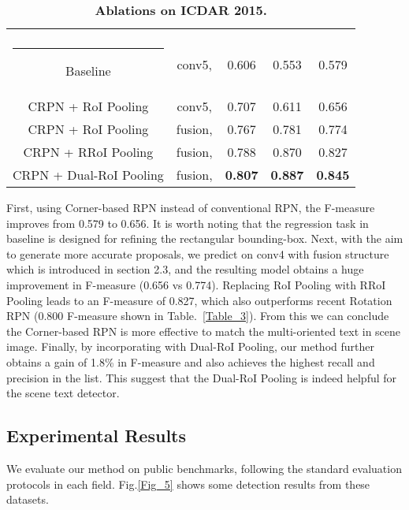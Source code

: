 \documentclass[3p, times]{elsarticle}
\makeatletter
\newcommand{\thickhline}{\noalign {\ifnum 0=`}\fi \hrule height 1pt
    \futurelet \reserved@a \@xhline
}
\newcommand{\topcaption}{\setlength{\abovecaptionskip}{0pt}\setlength{\belowcaptionskip}{8pt}\caption}
\makeatother
\begin{document}
\setlength{\tabcolsep}{8pt}
\begin{table}[!htb]
\centering
\topcaption{\textbf{Ablations on ICDAR 2015.}}
\label{Table_1}
\begin{tabular}{|c|c|c|c|c|}
    \hline
                    &       &     &  &  \\\thickhline
    Baseline                & conv5,   & 0.606       & 0.553       & 0.579       \\\hline
    CRPN + RoI Pooling      & conv5,   & 0.707       & 0.611       & 0.656       \\\hline
    CRPN + RoI Pooling      & fusion,   & 0.767       & 0.781       & 0.774       \\\hline
    CRPN + RRoI Pooling     & fusion,   & 0.788       & 0.870       & 0.827       \\\hline
    CRPN + Dual-RoI Pooling & fusion,   & {\bf 0.807} & {\bf 0.887} & {\bf 0.845} \\\hline
\end{tabular}
\end{table}
\setlength{\tabcolsep}{1.4pt}

First, using Corner-based RPN instead of conventional RPN, the F-measure improves from 0.579 to 0.656. It is worth noting that the regression task in baseline is designed for refining the rectangular bounding-box. Next, with the aim to generate more accurate proposals, we predict on conv4 with fusion structure which is introduced in section 2.3, and the resulting model obtains a huge improvement in F-measure (0.656 vs 0.774). Replacing RoI Pooling with RRoI Pooling leads to an F-measure of 0.827, which also outperforms recent Rotation RPN (0.800 F-measure shown in Table.~\ref{Table_3}). From this we can conclude the Corner-based RPN is more effective to match the multi-oriented text in scene image. Finally, by incorporating with Dual-RoI Pooling, our method further obtains a gain of 1.8\% in F-measure and also achieves the highest recall and precision in the list. This suggest that the Dual-RoI Pooling is indeed helpful for the scene text detector. 




\subsection{Experimental Results}
We evaluate our method on public benchmarks, following the standard evaluation protocols in each field. Fig.\ref{Fig_5} shows some detection results from these datasets. 
\end{document}
